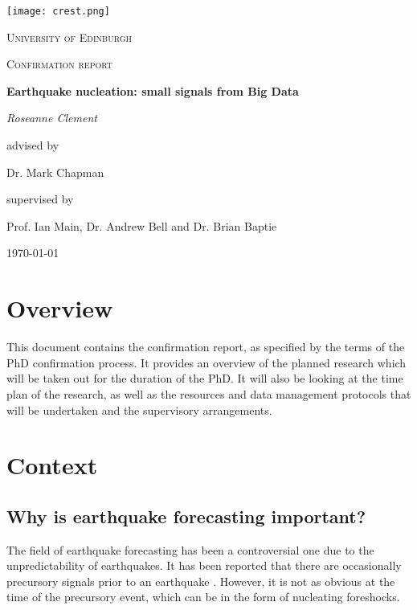 \documentclass[12pt]{report}
\begin{document}
	\begin{titlepage}
		\centering
		\texttt{[image: crest.png]}\par\vspace{1cm}
		{\scshape\LARGE University of Edinburgh \par}
		\vspace{1cm}
		{\scshape\Large Confirmation report\par}
		\vspace{1.5cm}
		{\huge\bfseries Earthquake nucleation: small signals from Big Data\par}
		\vspace{2cm}
		{\Large\itshape Roseanne Clement \par}
		\vfill
		advised by\par
		Dr. Mark Chapman\par
		supervised by\par
		Prof. Ian Main, Dr. Andrew Bell and Dr. Brian Baptie
		
		\vfill
		
		{\large \today\par}
	\end{titlepage}

\tableofcontents

\chapter{Overview}
This document contains the confirmation report, as specified by the terms of the PhD confirmation process. It provides an overview of the planned research which will be taken out for the duration of the PhD. It will also be looking at the time plan of the research, as well as the resources and data management protocols that will be undertaken and the supervisory arrangements. 

\chapter{Context}
\section{Why is earthquake forecasting important?}
The field of earthquake forecasting has been a controversial one due to the unpredictability of earthquakes. It has been reported that there are occasionally precursory signals prior to an earthquake \citep{Sholz2002}. However, it is not as obvious at the time of the precursory event, which can be in the form of nucleating foreshocks. 
\end{document}
